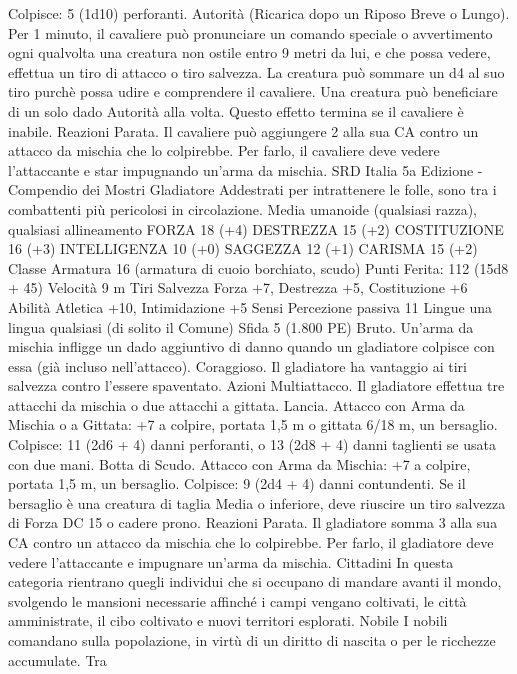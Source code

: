 \begin{multicols}{2}
Colpisce: 5 (1d10) perforanti.
Autorità (Ricarica dopo un Riposo Breve o Lungo). Per 1
minuto, il cavaliere può pronunciare un comando speciale o
avvertimento ogni qualvolta una creatura non ostile entro 9 metri
da lui, e che possa vedere, effettua un tiro di attacco o tiro
salvezza. La creatura può sommare un d4 al suo tiro purchè
possa udire e comprendere il cavaliere. Una creatura può
beneficiare di un solo dado Autorità alla volta. Questo effetto
termina se il cavaliere è inabile.
Reazioni
Parata. Il cavaliere può aggiungere 2 alla sua CA contro un
attacco da mischia che lo colpirebbe. Per farlo, il cavaliere deve
vedere l’attaccante e star impugnando un’arma da mischia.
SRD Italia 5a Edizione - Compendio dei Mostri
Gladiatore
Addestrati per intrattenere le folle, sono tra i
combattenti più pericolosi in circolazione.
Media umanoide (qualsiasi razza), qualsiasi allineamento
FORZA 18 (+4)
DESTREZZA 15 (+2)
COSTITUZIONE 16 (+3)
INTELLIGENZA 10 (+0)
SAGGEZZA 12 (+1)
CARISMA 15 (+2)
Classe Armatura 16 (armatura di cuoio borchiato, scudo)
\hspace*{0pt}\hfill{Punti Ferita}: 112 (15d8 + 45)
Velocità 9 m
Tiri Salvezza Forza +7, Destrezza +5, Costituzione +6
Abilità Atletica +10, Intimidazione +5
Sensi Percezione passiva 11
Lingue una lingua qualsiasi (di solito il Comune)
Sfida 5 (1.800 PE)
Bruto. Un’arma da mischia infligge un dado aggiuntivo di danno
quando un gladiatore colpisce con essa (già incluso nell’attacco).
Coraggioso. Il gladiatore ha vantaggio ai tiri salvezza contro
l’essere spaventato.
Azioni
Multiattacco. Il gladiatore effettua tre attacchi da mischia o due
attacchi a gittata.
Lancia. Attacco con Arma da Mischia o a Gittata: +7 a colpire,
portata 1,5 m o gittata 6/18 m, un bersaglio.
Colpisce: 11 (2d6 + 4) danni perforanti, o 13 (2d8 + 4) danni
taglienti se usata con due mani.
Botta di Scudo. Attacco con Arma da Mischia: +7 a colpire,
portata 1,5 m, un bersaglio.
Colpisce: 9 (2d4 + 4) danni contundenti. Se il bersaglio è una
creatura di taglia Media o inferiore, deve riuscire un tiro salvezza
di Forza DC 15 o cadere prono.
Reazioni
Parata. Il gladiatore somma 3 alla sua CA contro un attacco da
mischia che lo colpirebbe. Per farlo, il gladiatore deve vedere
l’attaccante e impugnare un’arma da mischia.
Cittadini
In questa categoria rientrano quegli individui che si
occupano di mandare avanti il mondo, svolgendo le
mansioni necessarie affinché i campi vengano coltivati,
le città amministrate, il cibo coltivato e nuovi territori
esplorati.
Nobile
I nobili comandano sulla popolazione, in virtù di un
diritto di nascita o per le ricchezze accumulate. Tra

\end{multicols}
